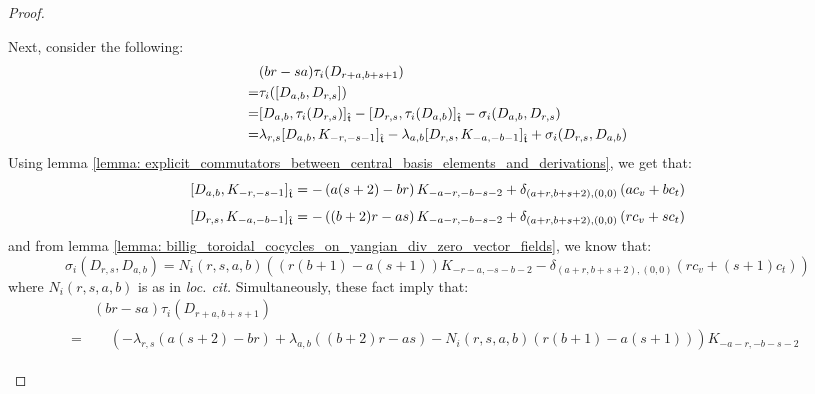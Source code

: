 \begin{proof}
\begin{itemize}
                    Next, consider the following:
                        $$
                            \begin{aligned}
                                & (br - sa) \tau_i(D_{r + a, b + s + 1})
                                \\
                                = & \tau_i( [D_{a, b}, D_{r, s}] )
                                \\
                                = & [D_{a, b}, \tau_i(D_{r, s})]_{\extendedtoroidal} - [D_{r, s}, \tau_i(D_{a, b})]_{\extendedtoroidal} - \sigma_i(D_{a, b}, D_{r, s})
                                \\
                                = & \lambda_{r, s} [D_{a, b}, K_{-r, -s - 1}]_{\extendedtoroidal} - \lambda_{a, b} [D_{r, s}, K_{-a, -b - 1}]_{\extendedtoroidal} + \sigma_i(D_{r, s}, D_{a, b})
                            \end{aligned}
                        $$
                    Using lemma \ref{lemma: explicit_commutators_between_central_basis_elements_and_derivations}, we get that:
                        $$[D_{a, b}, K_{-r, -s - 1}]_{\extendedtoroidal} = -\left( a(s + 2) - br \right) K_{-a - r, -b - s - 2} + \delta_{(a + r, b + s + 2), (0, 0)} \left( a c_v + b c_t \right)$$
                        $$[D_{r, s}, K_{-a, -b - 1}]_{\extendedtoroidal} = -\left( (b + 2) r - as \right) K_{-a - r, -b - s - 2} + \delta_{(a + r, b + s + 2), (0, 0)} \left( r c_v + s c_t \right)$$
                    and from lemma \ref{lemma: billig_toroidal_cocycles_on_yangian_div_zero_vector_fields}, we know that:
                        $$\sigma_i(D_{r, s}, D_{a, b}) = N_i(r, s, a, b) \left( ( r(b + 1) - a(s + 1) )K_{-r - a, -s - b - 2} - \delta_{ (a + r, b + s + 2), (0, 0) } (r c_v + (s + 1) c_t) \right)$$
                    where $N_i(r, s, a, b)$ is as in \textit{loc. cit.} Simultaneously, these fact imply that:
                        $$
                            \begin{aligned}
                                & (br - sa) \tau_i(D_{r + a, b + s + 1})
                                \\
                                = &
                                \begin{aligned}
                                    & \left( -\lambda_{r, s} \left( a(s + 2) - br \right) + \lambda_{a, b} \left( (b + 2) r - as \right) - N_i(r, s, a, b)\left( r(b + 1) - a(s + 1) \right) \right) K_{-a - r, -b - s - 2}

\end{aligned}
\end{aligned}$$
\end{itemize}
\end{proof}

